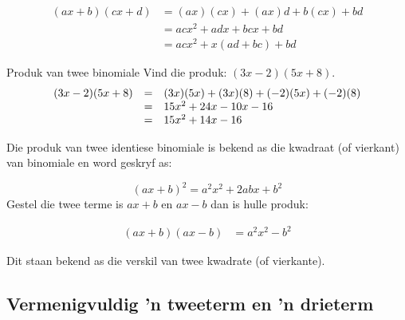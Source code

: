 \begin{align*}
  (ax+b)(cx+d) &= (ax)(cx)+(ax)d+b(cx)+bd \\
               &= ac{x}^{2}+adx +bcx+bd \\
               &= ac{x}^{2}+x(ad+bc)+bd
\end{align*}

% 
\par

\begin{wex}{Produk van twee binomiale }
{Vind die produk: $(3x-2)(5x+8)$. }{
\begin{equation*}
\begin{array}{ccl}\hfill (3x-2)(5x+8)& =& (3x)(5x)+(3x)(8)+(-2)(5x)+(-2)(8)\hfill \\
 & =& 15{x}^{2}+24x-10x-16\hfill \\
 & =& 15{x}^{2}+14x-16\hfill 
\end{array}
\end{equation*}
} 
\end{wex}

Die produk van twee identiese binomiale is bekend as die kwadraat (of vierkant) van binomiale en word geskryf
as:

\begin{equation*}
{(ax+b)}^{2}={a}^{2}{x}^{2}+2abx+{b}^{2}
\end{equation*}
Gestel die twee terme is $ax+b$ en $ax-b$ dan is hulle produk:

\begin{align*}
(ax+b)(ax-b) &={a}^{2}{x}^{2}-{b}^{2}
\end{align*}

Dit staan bekend as die verskil van twee kwadrate (of vierkante).


\subsection*{Vermenigvuldig 'n tweeterm en 'n drieterm}

